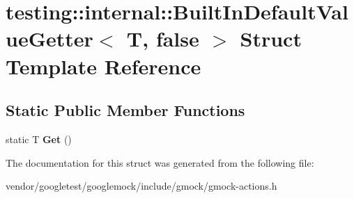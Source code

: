 \hypertarget{structtesting_1_1internal_1_1_built_in_default_value_getter_3_01_t_00_01false_01_4}{}\section{testing\+:\+:internal\+:\+:Built\+In\+Default\+Value\+Getter$<$ T, false $>$ Struct Template Reference}
\label{structtesting_1_1internal_1_1_built_in_default_value_getter_3_01_t_00_01false_01_4}
\subsection*{Static Public Member Functions}
\begin{DoxyCompactItemize}
\item 
\mbox{\label{structtesting_1_1internal_1_1_built_in_default_value_getter_3_01_t_00_01false_01_4_a8c8e929666f61272961eea21a60de4ad}} 
static T {\bfseries Get} ()
\end{DoxyCompactItemize}


The documentation for this struct was generated from the following file\+:\begin{DoxyCompactItemize}
\item 
vendor/googletest/googlemock/include/gmock/gmock-\/actions.\+h\end{DoxyCompactItemize}

